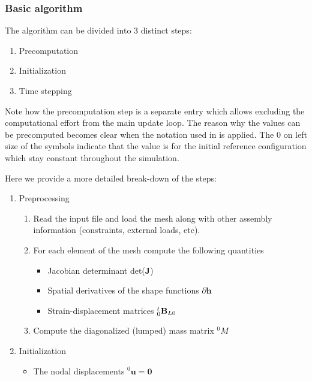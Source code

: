 \subsubsection{Basic algorithm} \label{fea-algorithm}

The algorithm can be divided into 3 distinct steps:

\begin{enumerate}

  \item Precomputation
  \item Initialization
  \item Time stepping

\end{enumerate}

Note how the precomputation step is a separate entry which allows excluding the computational effort from the main update loop. The reason why the values can be precomputed becomes clear when the notation used in \cite{bathe:1996} is applied. The $0$ on left size of the symbols indicate that the value is for the initial reference configuration which stay constant throughout the simulation.

Here we provide a more detailed break-down of the steps:

\begin{enumerate}

  \item Preprocessing

  \begin{enumerate}

    \item Read the input file and load the mesh along with other assembly information (constraints, external loads, etc).
    \item For each element of the mesh compute the following quantities

    \begin{itemize}

      \item Jacobian determinant det(\textbf{J})
      \item Spatial derivatives of the shape functions $\partial{\textbf{h}}$
      \item Strain-displacement matrices $_{0}^{t}\textrm{\textbf{B}}_{L0}$
    \end{itemize}

    \item Compute the diagonalized (lumped) mass matrix $^{0}M$

  \end{enumerate}

  \item Initialization
  \begin{itemize}
    \item The nodal displacements $^{0}\textbf{u} = \textbf{0}$
  \end{itemize}

\end{enumerate}



